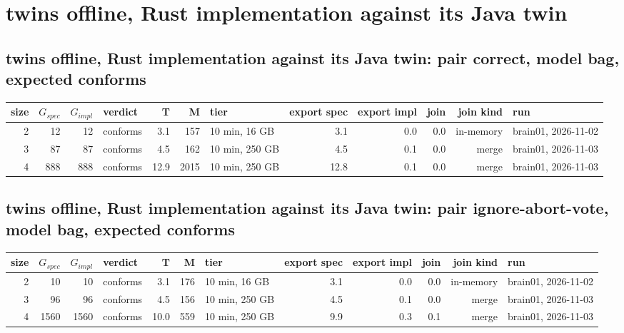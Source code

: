 \documentclass[10pt]{article}
\begin{document}
\section*{twins offline, Rust implementation against its Java twin}
\subsection*{twins offline, Rust implementation against its Java twin: pair \textsf{correct}, model bag, expected conforms}
\begin{longtable}{@{}rrrlrrlrrrrl@{}}
\toprule
size & $G_{\mathit{spec}}$ & $G_{\mathit{impl}}$ & verdict & T & M & tier & export spec & export impl & join & join kind & run \\
\midrule
\endhead
\color{red} 2 & 12 & 12 & conforms & 3.1 & 157 & 10 min, 16 GB & 3.1 & 0.0 & 0.0 & in-memory & brain01, 2026-11-02 \\
\color{blue} 3 & 87 & 87 & conforms & 4.5 & 162 & 10 min, 250 GB & 4.5 & 0.1 & 0.0 & merge & brain01, 2026-11-03 \\
\color{blue} 4 & 888 & 888 & conforms & 12.9 & 2015 & 10 min, 250 GB & 12.8 & 0.1 & 0.0 & merge & brain01, 2026-11-03 \\
\bottomrule
\end{longtable}
\subsection*{twins offline, Rust implementation against its Java twin: pair \textsf{ignore-abort-vote}, model bag, expected conforms}
\begin{longtable}{@{}rrrlrrlrrrrl@{}}
\toprule
size & $G_{\mathit{spec}}$ & $G_{\mathit{impl}}$ & verdict & T & M & tier & export spec & export impl & join & join kind & run \\
\midrule
\endhead
\color{red} 2 & 10 & 10 & conforms & 3.1 & 176 & 10 min, 16 GB & 3.1 & 0.0 & 0.0 & in-memory & brain01, 2026-11-02 \\
\color{blue} 3 & 96 & 96 & conforms & 4.5 & 156 & 10 min, 250 GB & 4.5 & 0.1 & 0.0 & merge & brain01, 2026-11-03 \\
\color{blue} 4 & 1560 & 1560 & conforms & 10.0 & 559 & 10 min, 250 GB & 9.9 & 0.3 & 0.1 & merge & brain01, 2026-11-03 \\
\bottomrule
\end{longtable}
\end{document}
